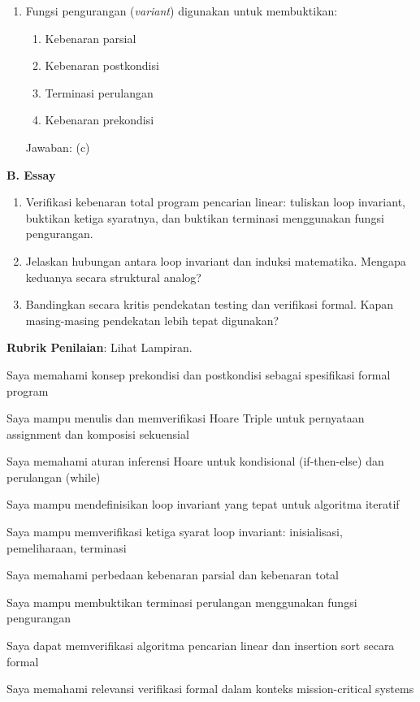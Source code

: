 \documentclass[../main]{subfiles}
\begin{document}
\begin{asesmen}
\begin{enumerate}
  \item Fungsi pengurangan (\textit{variant}) digunakan untuk membuktikan:
  \begin{enumerate}
    \item Kebenaran parsial
    \item Kebenaran postkondisi
    \item Terminasi perulangan
    \item Kebenaran prekondisi
  \end{enumerate}
  Jawaban: (c)
\end{enumerate}

\textbf{B. Essay}
\begin{enumerate}
  \item Verifikasi kebenaran total program pencarian linear: tuliskan loop invariant, buktikan ketiga syaratnya, dan buktikan terminasi menggunakan fungsi pengurangan.
  \item Jelaskan hubungan antara loop invariant dan induksi matematika. Mengapa keduanya secara struktural analog?
  \item Bandingkan secara kritis pendekatan testing dan verifikasi formal. Kapan masing-masing pendekatan lebih tepat digunakan?
\end{enumerate}

\textbf{Rubrik Penilaian}: Lihat Lampiran.
\end{asesmen}


\begin{checklist}
  \item Saya memahami konsep prekondisi dan postkondisi sebagai spesifikasi formal program
  \item Saya mampu menulis dan memverifikasi Hoare Triple untuk pernyataan assignment dan komposisi sekuensial
  \item Saya memahami aturan inferensi Hoare untuk kondisional (if-then-else) dan perulangan (while)
  \item Saya mampu mendefinisikan loop invariant yang tepat untuk algoritma iteratif
  \item Saya mampu memverifikasi ketiga syarat loop invariant: inisialisasi, pemeliharaan, terminasi
  \item Saya memahami perbedaan kebenaran parsial dan kebenaran total
  \item Saya mampu membuktikan terminasi perulangan menggunakan fungsi pengurangan
  \item Saya dapat memverifikasi algoritma pencarian linear dan insertion sort secara formal
  \item Saya memahami relevansi verifikasi formal dalam konteks mission-critical systems
\end{checklist}
\end{document}
